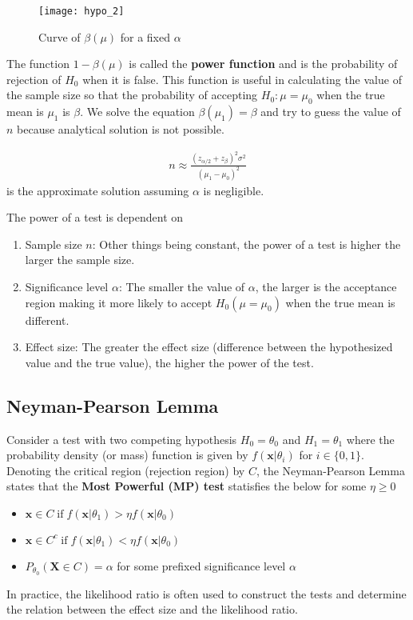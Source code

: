\documentclass[../probability-notes.tex]{subfiles}
\begin{document}
    \begin{figure}[h]
    \texttt{[image: hypo\_2]}
    \centering
    \caption{Curve of $\beta(\mu)$ for a fixed $\alpha$}
    \label{fig:hypo_2} %
    \end{figure}

    The function $1 - \beta(\mu)$ is called the \textbf{power function} and is the probability of rejection of $H_{0}$ when it is false. This function is useful in calculating the value of the sample size so that the probability of accepting $H_{0}: \mu = \mu_{0}$ when the true mean is $\mu_{1}$ is $\beta$. We solve the equation $\beta(\mu_{1}) = \beta$ and try to guess the value of $n$ because analytical solution is not possible.

    \begin{align*}
         n \approx \frac{(z_{\alpha/2} + z_{\beta})^{2} \sigma^{2}}{(\mu_{1} - \mu_{0})^{2}}
    \end{align*}
    is the approximate solution assuming $\alpha$ is negligible.\newline

    The power of a test is dependent on
    \begin{enumerate}
        \item Sample size $n$: Other things being constant, the power of a test is higher the larger the sample size.
        \item Significance level $\alpha$: The smaller the value of $\alpha$, the larger is the acceptance region making it more likely to accept $H_{0} (\mu = \mu_{0})$ when the true mean is different.
        \item Effect size: The greater the effect size (difference between the hypothesized value and the true value), the higher the power of the test.
    \end{enumerate}

    \subsection{Neyman-Pearson Lemma}\label{neyman-pearson}
    Consider a test with two competing hypothesis $H_{0} = \theta_{0}$ and $H_{1} = \theta_{1}$ where the probability density (or mass) function is given by $f(\mathbf{x} | \theta_{i})$ for $i \in \{0, 1\}$. Denoting the critical region (rejection region) by $C$, the Neyman-Pearson Lemma states that the \textbf{Most Powerful (MP) test} statisfies the below for some $\eta \geq 0$
    \begin{itemize}
        \item $\mathbf{x} \in C \; \text{if} \; f(\mathbf{x}|\theta_{1}) > \eta f(\mathbf{x}|\theta_{0})$
        \item $\mathbf{x} \in C^{c} \; \text{if} \; f(\mathbf{x}|\theta_{1}) < \eta f(\mathbf{x}|\theta_{0})$
        \item $P_{\theta_{0}}(\mathbf{X} \in C) = \alpha$ for some prefixed significance level $\alpha$
    \end{itemize}
    In practice, the likelihood ratio is often used to construct the tests and determine the relation between the effect size and the likelihood ratio.
\end{document}
